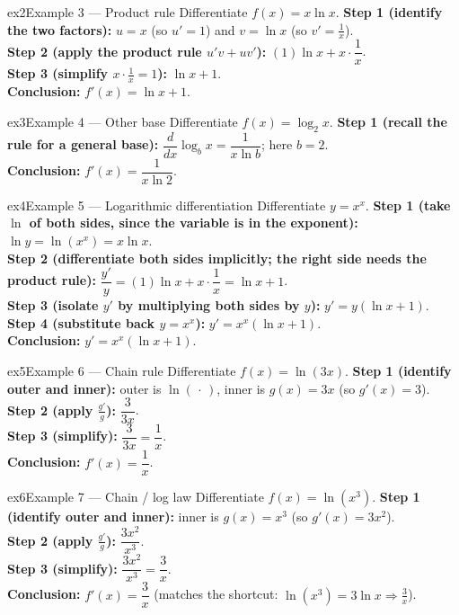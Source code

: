 \documentclass[11pt]{article}
\begin{document}
\begin{example}{ex2}{Example 3 --- Product rule}
Differentiate $f(x)=x\ln x$.\soln
\textbf{Step 1 (identify the two factors):} $u=x$ (so $u'=1$) and $v=\ln x$ (so $v'=\tfrac1x$).\\[3pt]
\textbf{Step 2 (apply the product rule $u'v+uv'$):} $(1)\ln x+x\cdot\dfrac1x$.\\[3pt]
\textbf{Step 3 (simplify $x\cdot\frac1x=1$):} $\ln x+1$.\\[3pt]
\textbf{Conclusion:} $f'(x)=\ln x+1$.
\end{example}

\begin{example}{ex3}{Example 4 --- Other base}
Differentiate $f(x)=\log_2 x$.\soln
\textbf{Step 1 (recall the rule for a general base):} $\dfrac{d}{dx}\log_b x=\dfrac1{x\ln b}$; here $b=2$.\\[3pt]
\textbf{Conclusion:} $f'(x)=\dfrac1{x\ln 2}$.
\end{example}

\begin{example}{ex4}{Example 5 --- Logarithmic differentiation}
Differentiate $y=x^x$.\soln
\textbf{Step 1 (take $\ln$ of both sides, since the variable is in the exponent):} $\ln y=\ln(x^x)=x\ln x$.\\[3pt]
\textbf{Step 2 (differentiate both sides implicitly; the right side needs the product rule):} $\dfrac{y'}{y}=(1)\ln x+x\cdot\dfrac1x=\ln x+1$.\\[3pt]
\textbf{Step 3 (isolate $y'$ by multiplying both sides by $y$):} $y'=y(\ln x+1)$.\\[3pt]
\textbf{Step 4 (substitute back $y=x^x$):} $y'=x^x(\ln x+1)$.\\[3pt]
\textbf{Conclusion:} $y'=x^x(\ln x+1)$.
\end{example}

\begin{example}{ex5}{Example 6 --- Chain rule}
Differentiate $f(x)=\ln(3x)$.\soln
\textbf{Step 1 (identify outer and inner):} outer is $\ln(\,\cdot\,)$, inner is $g(x)=3x$ (so $g'(x)=3$).\\[3pt]
\textbf{Step 2 (apply $\frac{g'}{g}$):} $\dfrac{3}{3x}$.\\[3pt]
\textbf{Step 3 (simplify):} $\dfrac{3}{3x}=\dfrac1x$.\\[3pt]
\textbf{Conclusion:} $f'(x)=\dfrac1x$.
\end{example}

\begin{example}{ex6}{Example 7 --- Chain / log law}
Differentiate $f(x)=\ln(x^3)$.\soln
\textbf{Step 1 (identify outer and inner):} inner is $g(x)=x^3$ (so $g'(x)=3x^2$).\\[3pt]
\textbf{Step 2 (apply $\frac{g'}{g}$):} $\dfrac{3x^2}{x^3}$.\\[3pt]
\textbf{Step 3 (simplify):} $\dfrac{3x^2}{x^3}=\dfrac3x$.\\[3pt]
\textbf{Conclusion:} $f'(x)=\dfrac3x$ (matches the shortcut: $\ln(x^3)=3\ln x\Rightarrow\tfrac3x$).
\end{example}
\end{document}
